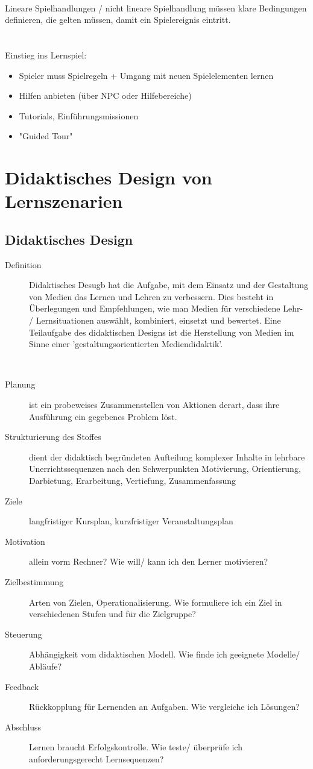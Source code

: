 \documentclass[a4paper]{article}
\begin{document}
~\\
Lineare Spielhandlungen / nicht lineare Spielhandlung müssen klare Bedingungen definieren, die gelten müssen, damit ein Spielereignis eintritt.\\~\\
\\
Einstieg ins Lernspiel:
\begin{itemize}
	\item Spieler muss Spielregeln + Umgang mit neuen Spielelementen lernen
	\item Hilfen anbieten (über NPC oder Hilfebereiche)
	\item Tutorials, Einführungsmissionen
	\item "Guided Tour"
\end{itemize}

\section{Didaktisches Design von Lernszenarien}

 \subsection{Didaktisches Design}
 
\begin{description}
	\item[Definition] Didaktisches Desugb hat die Aufgabe, mit dem Einsatz und der Gestaltung von Medien das Lernen und Lehren zu verbessern. Dies besteht in Überlegungen und Empfehlungen, wie man Medien für verschiedene Lehr- / Lernsituationen auswählt, kombiniert, einsetzt und bewertet. Eine Teilaufgabe des didaktischen Designs ist die Herstellung von Medien im Sinne einer 'gestaltungsorientierten Mediendidaktik'.
\end{description}
~\\
\begin{description}
	\item[Planung] ist ein probeweises Zusammenstellen von Aktionen derart, dass ihre Ausführung ein gegebenes Problem löst.
	\item[Strukturierung des Stoffes] dient der didaktisch begründeten Aufteilung komplexer Inhalte in lehrbare Unerrichtssequenzen nach den Schwerpunkten Motivierung, Orientierung, Darbietung, Erarbeitung, Vertiefung, Zusammenfassung
	\item[Ziele] langfristiger Kursplan, kurzfristiger Veranstaltungsplan
	\item[Motivation] allein vorm Rechner? Wie will/ kann ich den Lerner motivieren?
	\item[Zielbestimmung] Arten von Zielen, Operationalisierung. Wie formuliere ich ein Ziel in verschiedenen Stufen und für die Zielgruppe?
	\item[Steuerung] Abhängigkeit vom didaktischen Modell. Wie finde ich geeignete Modelle/ Abläufe?
	\item[Feedback] Rückkopplung für Lernenden an Aufgaben. Wie vergleiche ich Lösungen?
	\item[Abschluss] Lernen braucht Erfolgskontrolle. Wie teste/ überprüfe ich anforderungsgerecht Lernsequenzen?
\end{description}
\end{document}
